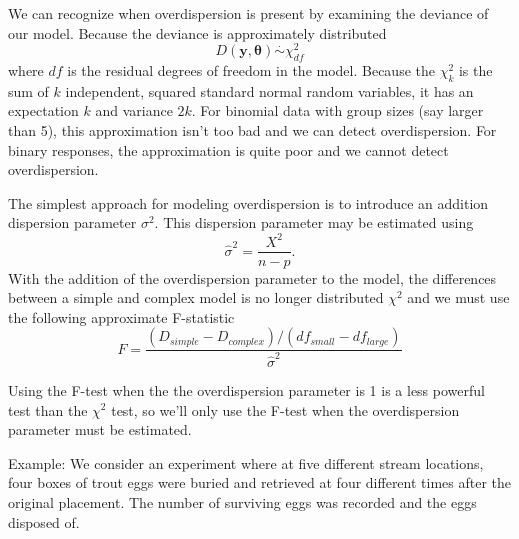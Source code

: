 \documentclass[]{book}
\newenvironment{Shaded}{\begin{snugshade}}{\end{snugshade}}
\newcommand{\KeywordTok}[1]{\textcolor[rgb]{0.13,0.29,0.53}{\textbf{{#1}}}}
\newcommand{\DataTypeTok}[1]{\textcolor[rgb]{0.13,0.29,0.53}{{#1}}}
\newcommand{\StringTok}[1]{\textcolor[rgb]{0.31,0.60,0.02}{{#1}}}
\newcommand{\NormalTok}[1]{{#1}}
\theoremstyle{definition}
\theoremstyle{definition}
\theoremstyle{remark}
\begin{document}
We can recognize when overdispersion is present by examining the
deviance of our model. Because the deviance is approximately distributed
\[D\left(\boldsymbol{y},\boldsymbol{\theta}\right)\stackrel{\cdot}{\sim}\chi_{df}^{2}\]
where \(df\) is the residual degrees of freedom in the model. Because
the \(\chi_{k}^{2}\) is the sum of \(k\) independent, squared standard
normal random variables, it has an expectation \(k\) and variance
\(2k\). For binomial data with group sizes (say larger than 5), this
approximation isn't too bad and we can detect overdispersion. For binary
responses, the approximation is quite poor and we cannot detect
overdispersion.

The simplest approach for modeling overdispersion is to introduce an
addition dispersion parameter \(\sigma^{2}\). This dispersion parameter
may be estimated using \[\hat{\sigma}^{2}=\frac{X^{2}}{n-p}.\] With the
addition of the overdispersion parameter to the model, the differences
between a simple and complex model is no longer distributed \(\chi^{2}\)
and we must use the following approximate F-statistic
\[F=\frac{\left(D_{simple}-D_{complex}\right)/\left(df_{small}-df_{large}\right)}{\hat{\sigma}^{2}}\]

Using the F-test when the the overdispersion parameter is 1 is a less
powerful test than the \(\chi^{2}\) test, so we'll only use the F-test
when the overdispersion parameter must be estimated.

Example: We consider an experiment where at five different stream
locations, four boxes of trout eggs were buried and retrieved at four
different times after the original placement. The number of surviving
eggs was recorded and the eggs disposed of.

\begin{Shaded}
\end{Shaded}
\end{document}
